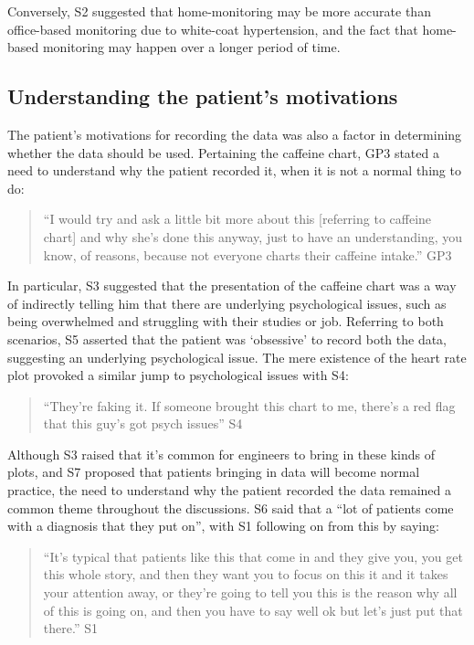 \documentclass{sigchi}
\begin{document}
Conversely, S2 suggested that home-monitoring may be more accurate than office-based monitoring due to white-coat hypertension, and the fact that home-based monitoring may happen over a longer period of time.


\subsection{Understanding the patient’s motivations}

The patient’s motivations for recording the data was also a factor in determining whether the data should be used. Pertaining the caffeine chart, GP3 stated a need to understand why the patient recorded it, when it is not a normal thing to do:

\begin{quote}
    ``I would try and ask a little bit more about this [referring to caffeine chart] and why she's done this anyway, just to have an understanding, you know, of reasons, because not everyone charts their caffeine intake.'' GP3
\end{quote}

In particular, S3 suggested that the presentation of the caffeine chart was a way of indirectly telling him that there are underlying psychological issues, such as being overwhelmed and struggling with their studies or job. Referring to both scenarios, S5 asserted that the patient was ‘obsessive’ to record both the data, suggesting an underlying psychological issue. The mere existence of the heart rate plot provoked a similar jump to psychological issues with S4:

\begin{quote}
    ``They’re faking it. If someone brought this chart to me, there’s a red flag that this guy’s got psych issues'' S4
\end{quote}

Although S3 raised that it’s common for engineers to bring in these kinds of plots, and S7 proposed that patients bringing in data will become normal practice, the need to understand why the patient recorded the data remained a common theme throughout the discussions. S6 said that a ``lot of patients come with a diagnosis that they put on'', with S1 following on from this by saying:

\begin{quote}
    ``It's typical that patients like this that come in and they give you, you get this whole story, and then they want you to focus on this it and it takes your attention away, or they're going to tell you this is the reason why all of this is going on, and then you have to say well ok but let's just put that there.'' S1
\end{quote}
\end{document}
